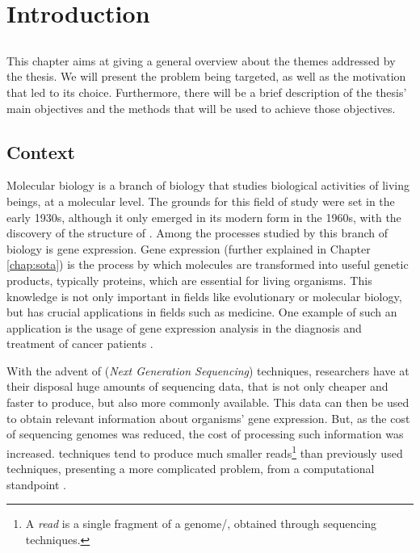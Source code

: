 \chapter{Introduction} \label{chap:intro}

\section*{}

This chapter aims at giving a general overview about the themes addressed by the
thesis. We will present the problem being targeted, as well as the motivation
that led to its choice. Furthermore, there will be a brief description of the
thesis' main objectives and the methods that will be used to achieve those
objectives.

\section{Context} \label{sec:context}

Molecular biology is a branch of biology that studies biological activities of
living beings, at a molecular level. The grounds for this field of study were
set in the early 1930s, although it only emerged in its modern form in the
1960s, with the discovery of the structure of \dna. Among the processes studied
by this branch of biology is gene expression. Gene expression (further explained
in Chapter \ref{chap:sota}) is the process by which \dna{} molecules are
transformed into useful genetic products, typically proteins, which are
essential for living organisms. This knowledge is not only important in fields
like evolutionary or molecular biology, but has crucial applications in fields
such as medicine. One example of such an application is the usage of gene
expression analysis in the diagnosis and treatment of cancer patients
\cite{Pusztai01062003}.

With the advent of \ngs{} (\textit{Next Generation Sequencing}) techniques, researchers
have at their disposal huge amounts of sequencing data, that is not only cheaper
and faster to produce, but also more commonly available. This data can then be
used to obtain relevant information about organisms' gene expression. But, as
the cost of sequencing genomes was reduced, the cost of processing such
information was increased. \ngs{} techniques tend to produce much smaller
reads\footnote{A \textit{read} is a single fragment of a genome/\trans, obtained
through sequencing techniques.} than previously used techniques, presenting a
more complicated problem, from a computational standpoint \cite{Wolf2013}.

